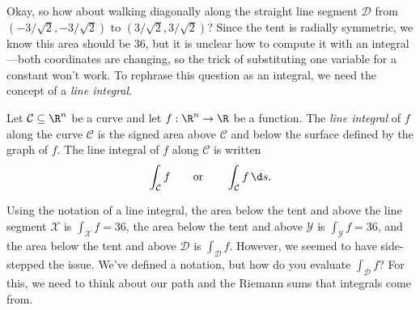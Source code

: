 Okay, so how about walking diagonally along the straight line
segment $\mathcal D$ from $(-3/\sqrt{2},-3/\sqrt{2})$ to $(3/\sqrt{2},3/\sqrt{2})$?
Since the tent is radially symmetric, we know this area should be $36$, but
it is unclear how to compute it with an integral---both coordinates are changing,
so the trick of substituting one variable for a constant won't work.  To rephrase
this question as an integral, we need the concept of a \emph{line integral}.


\begin{definition}
	Let $\mathcal C\subseteq \R^n$ be a curve and let $f:\R^n\to\R$
	be a function.  The \emph{line integral} of $f$ along the curve $\mathcal C$
	is the signed area above $\mathcal C$ and below the surface defined by
	the graph of $f$.  The line integral of $f$ along $\mathcal C$ is written
	\[
		\int_{\mathcal C} f\qquad\text{or}\qquad
		\int_{\mathcal C} f\,\d s.
	\]
\end{definition}

Using the notation of a line integral, the area below the tent
and above the line segment $\mathcal X$ is $\int_{\mathcal X} f=36$,
the area below the tent and above $\mathcal Y$ is $\int_{\mathcal Y} f=36$,
and the area below the tent and above $\mathcal D$ is $\int_{\mathcal D} f$.
However, we seemed to have side-stepped the issue.  We've defined a notation,
but how do you evaluate $\int_{\mathcal D}f$?  For this, we need
to think about our path and the Riemann sums that integrals come from.

